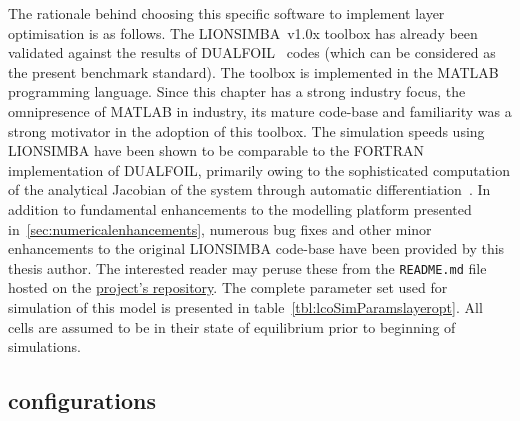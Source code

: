 The  rationale  behind  choosing  this  specific  software  to  implement  layer
optimisation  is  as  follows.  The LIONSIMBA~v1.0x  toolbox  has  already  been
validated against  the results of DUALFOIL~\cite{Dualfoil1998}  codes (which can
be considered as the present benchmark  standard). The toolbox is implemented in
the  MATLAB programming  language.  Since  this chapter  has  a strong  industry
focus,  the  omnipresence  of  MATLAB  in industry,  its  mature  code-base  and
familiarity  was  a strong  motivator  in  the  adoption  of this  toolbox.  The
simulation  speeds using  LIONSIMBA  have been  shown to  be  comparable to  the
FORTRAN  implementation  of  DUALFOIL,  primarily  owing  to  the  sophisticated
computation  of  the  analytical  Jacobian   of  the  system  through  automatic
differentiation~\cite{Torchio2016}.  In  addition  to  fundamental  enhancements
to   the  modelling   platform  presented   in~\cref{sec:numericalenhancements},
numerous  bug fixes  and  other  minor enhancements  to  the original  LIONSIMBA
code-base   have  been   provided  by   this  thesis   author.  The   interested
reader  may  peruse  these  from  the  \texttt{README.md}  file  hosted  on  the
\href{https://github.com/lionsimbatoolbox/LIONSIMBA}{project's  repository}. The
complete  parameter set  used  for  simulation of  this  model  is presented  in
table~\ref{tbl:lcoSimParamslayeropt}. All cells are assumed to be in their state
of equilibrium prior to beginning of simulations.



\subsection{ configurations}




